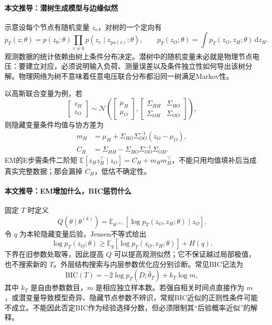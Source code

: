 \documentclass[UTF8,11pt,fontset=fandol]{ctexart}
\newcommand{\E}{\mathbb{E}}
\theoremstyle{remark}
\numberwithin{equation}{section}
\begin{document}
\paragraph{本文推导：潜树生成模型与边缘似然}
示意设每个节点有随机变量 $z_v$，对树的一个定向有
\begin{equation}
 p_T(z;\theta)=p(z_0;\theta)\prod_{v\ne0}p(z_v\mid z_{\mathrm{pa}(v)};\theta),
 \qquad p_T(z_O;\theta)=\int p_T(z_O,z_H;\theta)\,\mathrm dz_H.
\end{equation}
观测数据的统计依赖由树上条件分布决定。潜树中的随机变量未必就是物理节点电压：要建立对应，必须说明输入负荷、测量误差以及条件独立性如何导出该树分解。物理网络为树不意味着任意电压联合分布都沿同一树满足Markov性。

以高斯联合变量为例，若
\begin{equation}
 \begin{bmatrix}z_H\\z_O\end{bmatrix}\sim
 \mathcal N\left(\begin{bmatrix}\mu_H\\\mu_O\end{bmatrix},
 \begin{bmatrix}\Sigma_{HH}&\Sigma_{HO}\\\Sigma_{OH}&\Sigma_{OO}\end{bmatrix}\right),
\end{equation}
则隐藏变量条件均值与协方差为
\begin{align}
 m_H&=\mu_H+\Sigma_{HO}\Sigma_{OO}^{-1}(z_O-\mu_O),\\
 C_H&=\Sigma_{HH}-\Sigma_{HO}\Sigma_{OO}^{-1}\Sigma_{OH}.
\end{align}
EM的E步需条件二阶矩 $\E[z_Hz_H^\top\mid z_O]=C_H+m_Hm_H^\top$，不能只用均值填补后当成真实完整数据；那会漏掉 $C_H$，低估不确定性。

\paragraph{本文推导：EM增加什么，BIC惩罚什么}
固定 $T$ 时定义
\begin{equation}
 Q(\theta\mid\theta^{(k)})=
 \E_{\theta^{(k)}}[\log p_T(z_O,z_H;\theta)\mid z_O].
\end{equation}
令 $q$ 为本轮隐藏变量后验，Jensen不等式给出
\begin{equation}
 \log p_T(z_O;\theta)\geq
 \E_q[\log p_T(z_O,z_H;\theta)]+H(q).
\end{equation}
下界在旧参数处取等，因此提高 $Q$ 可以提高观测似然；它不保证越过局部极值，也不搜索新的 $T$。外层结构搜索与内层参数优化应分别诊断。常见BIC记法为
\begin{equation}
 \mathrm{BIC}(T)=-2\log p_T(D;\widehat\theta_T)+k_T\log m,
\end{equation}
其中 $k_T$ 是自由参数数目，$m$ 是相应独立样本数。若强自相关时间点直接作为 $m$，或潜变量导致模型奇异、隐藏节点参数不辨识，常规BIC近似的正则性条件可能不成立。不能因此否定BIC作为经验选择分数，但必须限制其“后验概率近似”的解释。
\end{document}
